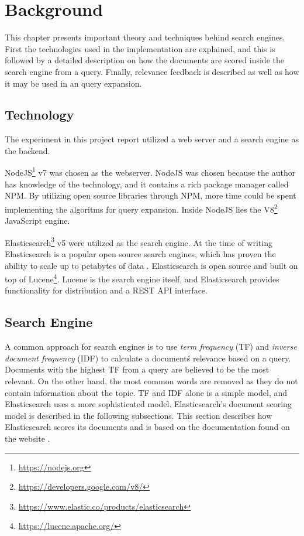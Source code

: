 \chapter{Background}
\label{ch:background}
This chapter presents important theory and techniques behind search engines.
First the technologies used in the implementation are explained,
and this is followed by a detailed description on how the documents are scored inside the search engine from a query.
Finally, relevance feedback is described as well as how it may be used in an query expansion.

\section{Technology}
The experiment in this project report utilized a web server and a search engine as the backend.

NodeJS\footnote{\url{https://nodejs.org}} v7 was chosen as the webserver.
NodeJS was chosen because the author has knowledge of the technology,
and it contains a rich package manager called NPM.
By utilizing open source libraries through NPM, more time could be spent implementing the algoritms for query expansion.
Inside NodeJS lies the V8\footnote{\url{https://developers.google.com/v8/}} JavaScript engine.

Elasticsearch\footnote{\url{https://www.elastic.co/products/elasticsearch}} v5 were utilized as the search engine.
At the time of writing Elasticsearch is a popular open source search engines, which has proven the ability to scale up to petabytes of data \cite{elasticsearch-scale}.
Elasticsearch is open source and built on top of Lucene\footnote{\url{https://lucene.apache.org/}}.
Lucene is the search engine itself,
and Elasticsearch provides functionality for distribution and a REST API interface.

\section{Search Engine}
A common approach for search engines is to use \textit{term frequency} (TF) and \textit{inverse document frequency} (IDF) to calculate a document\'s relevance based on a query.
Documents with the highest TF from a query are believed to be the most relevant.
On the other hand, the most common words are removed as they do not contain information about the topic.
TF and IDF alone is a simple model, and Elasticsearch uses a more sophisticated model.
Elasticsearch's document scoring model is described in the following subsections.
This section describes how Elasticsearch scores its documents and is based on the documentation found on the website \cite{elasticsearch-scoring}.


